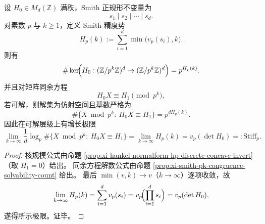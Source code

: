 \begin{proposition}\label{prop:xi-padic-branch-entropy-saturation-law}
设 \(H_0\in M_d(\mathbb Z)\) 满秩，Smith 正规形不变量为
\[
s_1\mid s_2\mid\cdots\mid s_d.
\]
对素数 \(p\) 与 \(k\ge 1\)，定义 Smith 精度势
\[
H_p(k):=\sum_{i=1}^{d}\min\bigl(v_p(s_i),k\bigr).
\]
则有
\[
\#\ker\!\Bigl(H_0:(\mathbb Z/p^k\mathbb Z)^d\to(\mathbb Z/p^k\mathbb Z)^d\Bigr)=p^{H_p(k)}.
\]
并且对矩阵同余方程
\[
H_0X\equiv H_1\pmod{p^k},
\]
若可解，则解集为仿射空间且基数严格为
\[
\#\{X\bmod p^k:\ H_0X\equiv H_1\}=p^{dH_p(k)}.
\]
因此在可解层级上有增长极限
\[
\lim_{k\to\infty}\frac1d\log_p\#\{X\bmod p^k:\ H_0X\equiv H_1\}
=\lim_{k\to\infty}H_p(k)
=v_p(\det H_0)
=:\mathrm{Stiff}_p.
\]
\end{proposition}
\begin{proof}
核规模公式由命题 \ref{prop:xi-hankel-normalform-hp-discrete-concave-invert}（取 \(H_1=0\)）给出。
同余方程解数公式由命题 \ref{prop:xi-smith-pk-congruence-solvability-count} 给出。
最后 \(\min(v,k)\to v\)（\(k\to\infty\)）逐项收敛，故
\[
\lim_{k\to\infty}H_p(k)=\sum_{i=1}^{d}v_p(s_i)=v_p\!\Bigl(\prod_{i=1}^{d}s_i\Bigr)=v_p(\det H_0),
\]
遂得所示极限。证毕。
\end{proof}

